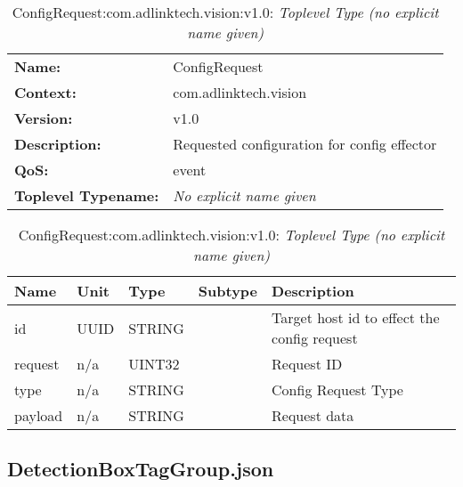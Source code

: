 \begin{table}[H]
\begin{tabularx}{\textwidth}{l X} 
       \textbf{Name:} & ConfigRequest \\ 
	   \textbf{Context:} & com.adlinktech.vision \\ 
	   \textbf{Version:} & v1.0 \\ 
	   \textbf{Description:} & Requested configuration for config effector \\ 
	   \textbf{QoS:} & event \\
	   \textbf{Toplevel Typename:} & \textit{No explicit name given} \\ 
\end{tabularx}
\caption{ConfigRequest:com.adlinktech.vision:v1.0}\label{ConfigRequestTagGroup.json:table:ConfigRequest}
\bigskip
\begin{tabularx}{\textwidth}{l l l l X} 
	 \textbf{Name} & \textbf{Unit} & \textbf{Type} & \textbf{Subtype} & \textbf{Description} \\
	 \midrule
   id & UUID & STRING &  & Target host id to effect the config request \\
   request & n/a & UINT32 &  & Request ID \\
   type & n/a & STRING &  & Config Request Type \\
   payload & n/a & STRING &  & Request data \\
\end{tabularx}
\caption{ConfigRequest:com.adlinktech.vision:v1.0: \textit{Toplevel Type (no explicit name given)}}\label{ConfigRequestTagGroup.json:table:ConfigRequest-no-type-given}


\end{table}

\subsection{DetectionBoxTagGroup.json}

